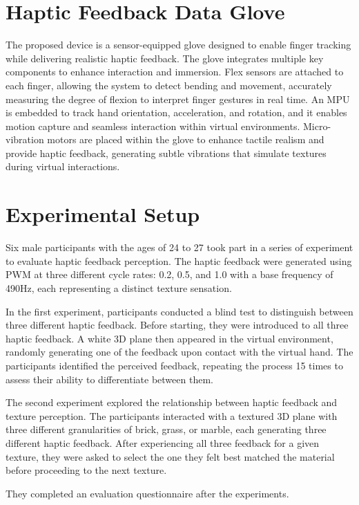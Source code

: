 \documentclass[a4paper,twocolumn]{article}
\begin{document}
\section{Haptic Feedback Data Glove}
The proposed device is a sensor-equipped glove designed to enable finger tracking while delivering realistic haptic feedback. The glove integrates multiple key components to enhance interaction and immersion. Flex sensors are attached to each finger, allowing the system to detect bending and movement, accurately measuring the degree of flexion to interpret finger gestures in real time. An MPU is embedded to track hand orientation, acceleration, and rotation, and it enables motion capture and seamless interaction within virtual environments. Micro-vibration motors are placed within the glove to enhance tactile realism and provide haptic feedback, generating subtle vibrations that simulate textures during virtual interactions.

\section{Experimental Setup}
Six male participants with the ages of 24 to 27 took part in a series of experiment to evaluate haptic feedback perception. The haptic feedback were generated using PWM at three different cycle rates: 0.2, 0.5, and 1.0 with a base frequency of 490Hz, each representing a distinct texture sensation.\par
In the first experiment, participants conducted a blind test to distinguish between three different haptic feedback. Before starting, they were introduced to all three haptic feedback. A white 3D plane then appeared in the virtual environment, randomly generating one of the feedback upon contact with the virtual hand. The participants identified the perceived feedback, repeating the process 15 times to assess their ability to differentiate between them.\par
The second experiment explored the relationship between haptic feedback and texture perception. The participants interacted with a textured 3D plane with  three different granularities of brick, grass, or marble, each generating three different haptic feedback. After experiencing all three feedback for a given texture, they were asked to select the one they felt best matched the material before proceeding to the next texture.\par
They completed an evaluation questionnaire after the experiments. 					
\end{document}
